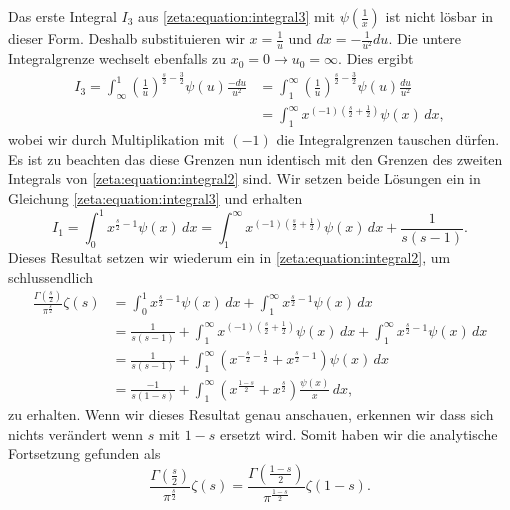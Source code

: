 Das erste Integral $I_3$ aus \eqref{zeta:equation:integral3} mit $\psi \left(\frac{1}{x} \right)$ ist nicht lösbar in dieser Form.
Deshalb substituieren wir $x = \frac{1}{u}$ und $dx = -\frac{1}{u^2}du$.
Die untere Integralgrenze wechselt ebenfalls zu $x_0 = 0 \rightarrow u_0 = \infty$.
Dies ergibt
\begin{align}
    I_3
    =
    \int_{\infty}^{1}
    \left(
    \frac{1}{u}
    \right)^{\frac{s}{2}-\frac{3}{2}}
    \psi(u)
    \frac{-du}{u^2}
    &=
    \int_{1}^{\infty}
    \left(
    \frac{1}{u}
    \right)^{\frac{s}{2}-\frac{3}{2}}
    \psi(u)
    \frac{du}{u^2}
    \\
    &=
    \int_{1}^{\infty}
    x^{(-1) \left(\frac{s}{2}+\frac{1}{2}\right)}
    \psi(x)
    \,dx,
\end{align}
wobei wir durch Multiplikation mit $(-1)$ die Integralgrenzen tauschen dürfen.
Es ist zu beachten das diese Grenzen nun identisch mit den Grenzen des zweiten Integrals von \eqref{zeta:equation:integral2} sind.
Wir setzen beide Lösungen ein in Gleichung \eqref{zeta:equation:integral3} und erhalten
\begin{equation}
    I_1
    =
    \int_0^{1}
    x^{\frac{s}{2}-1}
    \psi(x)
    \,dx
    =
    \int_{1}^{\infty}
    x^{(-1) \left(\frac{s}{2}+\frac{1}{2}\right)}
    \psi(x)
    \,dx
    +
    \frac{1}{s(s-1)}.
\end{equation}
Dieses Resultat setzen wir wiederum ein in \eqref{zeta:equation:integral2}, um schlussendlich
\begin{align}
    \frac{\Gamma \left( \frac{s}{2} \right)}{\pi^{\frac{s}{2}}}
    \zeta(s)
    &=
    \int_0^{1}
    x^{\frac{s}{2}-1}
    \psi(x)
    \,dx
    +
    \int_1^{\infty}
    x^{\frac{s}{2}-1}
    \psi(x)
    \,dx
    \nonumber
    \\
    &=
    \frac{1}{s(s-1)}
    +
    \int_{1}^{\infty}
    x^{(-1) \left(\frac{s}{2}+\frac{1}{2}\right)}
    \psi(x)
    \,dx
    +
    \int_1^{\infty}
    x^{\frac{s}{2}-1}
    \psi(x)
    \,dx
    \\
    &=
    \frac{1}{s(s-1)}
    +
    \int_{1}^{\infty}
    \left(
    x^{-\frac{s}{2}-\frac{1}{2}}
    +
    x^{\frac{s}{2}-1}
    \right)
    \psi(x)
    \,dx
    \\
    &=
    \frac{-1}{s(1-s)}
    +
    \int_{1}^{\infty}
    \left(
    x^{\frac{1-s}{2}}
    +
    x^{\frac{s}{2}}
    \right)
    \frac{\psi(x)}{x}
    \,dx,
\end{align}
zu erhalten.
Wenn wir dieses Resultat genau anschauen, erkennen wir dass sich nichts verändert wenn $s$ mit $1-s$ ersetzt wird.
Somit haben wir die analytische Fortsetzung gefunden als
\begin{equation}\label{zeta:equation:functional}
    \frac{\Gamma \left( \frac{s}{2} \right)}{\pi^{\frac{s}{2}}}
    \zeta(s)
    =
    \frac{\Gamma \left( \frac{1-s}{2} \right)}{\pi^{\frac{1-s}{2}}}
    \zeta(1-s).
\end{equation}

